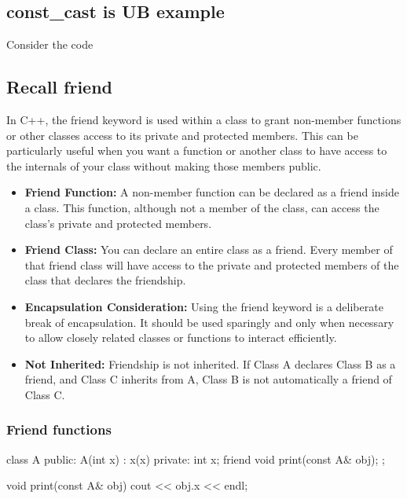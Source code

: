 \documentclass{report}
\begin{document}
\bigbreak \noindent 
\subsection{const\_cast is UB example}
\bigbreak \noindent 
Consider the code

\pagebreak 
{}
\bigbreak \noindent 
\subsection{Recall friend}
\bigbreak \noindent 
In C++, the friend keyword is used within a class to grant non-member functions or other classes access to its private and protected members. This can be particularly useful when you want a function or another class to have access to the internals of your class without making those members public.
\begin{itemize}
    \item \textbf{Friend Function:} A non-member function can be declared as a friend inside a class. This function, although not a member of the class, can access the class's private and protected members.
    \item \textbf{Friend Class:} You can declare an entire class as a friend. Every member of that friend class will have access to the private and protected members of the class that declares the friendship.
    \item \textbf{Encapsulation Consideration:} Using the friend keyword is a deliberate break of encapsulation. It should be used sparingly and only when necessary to allow closely related classes or functions to interact efficiently.
    \item \textbf{Not Inherited:} Friendship is not inherited. If Class A declares Class B as a friend, and Class C inherits from A, Class B is not automatically a friend of Class C.
\end{itemize}


\bigbreak \noindent 
\subsubsection{Friend functions}
\bigbreak \noindent 
\begin{cppcode}
    class A {
        public:
        A(int x) : x(x) {}
        private:
        int x{};
        friend void print(const A& obj); 
    };

    void print(const A& obj) {
        cout << obj.x << endl;
    }
\end{cppcode}
\end{document}
